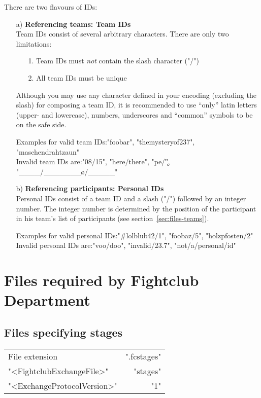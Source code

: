 \documentclass[11pt]{ltxdoc}
\def\highlight#1{%
    \colorbox{red!15}{#1}%
    \index{\textsf{#1}}}
\begin{document}
    \medskip
    There are two flavours of IDs:
    \begin{itemize}
        \item[a)] \textbf{Referencing teams: \highlight{Team IDs}} \\
            Team IDs consist of several arbitrary characters. There are only two limitations:
            \begin{itemize}
                \item[1.] Team IDs must \textit{not} contain the slash character ("/")
                \item[2.] All team IDs must be unique
            \end{itemize}
            
            Although you may use any character defined in your encoding (excluding the slash) for composing a team ID, it is recommended to use \enquote{only} latin letters (upper- and lowercase), numbers, underscores and \enquote{common} symbols to be on the safe side.
            
            \smallskip
            Examples for valid team IDs:\quad "foobar", "themysteryof237", "maschendrahtzaun" \\
            Invalid team IDs are:\quad "08/15", "here/there", "pe/\k", "____/\_______\o/_____"

        
        \item[b)] \textbf{Referencing participants: \highlight{Personal IDs}} \\
            Personal IDs consist of a team ID and a slash ("/") followed by an integer number. The integer number is determined by the position of the participant in his team's list of participants (see section~\ref{sec:files-teams}).
            
            \smallskip
            Examples for valid personal IDs:\quad "#lolblub42/1", "foobaz/5", "holzpfosten/2" \\
            Invalid personal IDs are:\quad "voo/doo", "invalid/23.7", "not/a/personal/id"
    \end{itemize}

    
    
    
    
    \clearpage
    \section{Files required by Fightclub Department}
    \subsection{Files specifying stages}\label{sec:files-stages}
    \begin{center}
        \begin{tabular}{lr}
            File extension              & ".fcstages" \\
            "<FightclubExchangeFile>"   & "stages" \\
            "<ExchangeProtocolVersion>" & "1"
        \end{tabular}
    \end{center}
    
\end{document}
